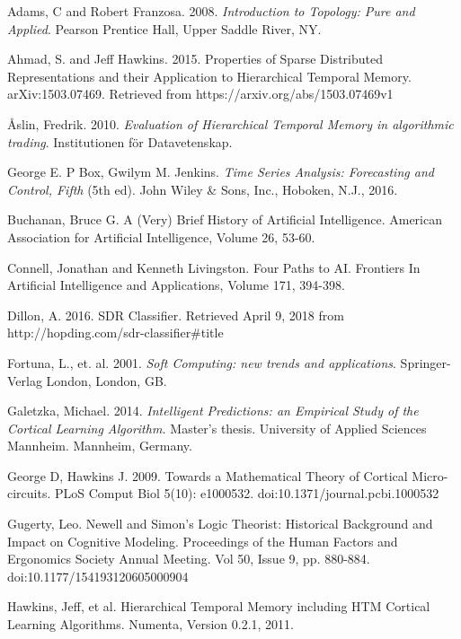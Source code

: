 \documentclass[fleqn,notitlepage,minimal]{article}
\begin{document}
	\newpage
	
	\begin{thebibliography}{99}
				
		 Adams, C and Robert Franzosa. 2008. \textit{Introduction to Topology: Pure and Applied}. Pearson Prentice Hall, Upper Saddle River, NY.
				
		 Ahmad, S. and Jeff Hawkins. 2015. Properties of Sparse Distributed Representations and their Application to Hierarchical Temporal Memory. arXiv:1503.07469. Retrieved from https://arxiv.org/abs/1503.07469v1
		
		 \r{A}slin, Fredrik. 2010. \textit{Evaluation of Hierarchical Temporal Memory in algorithmic trading}. Institutionen f\"{o}r Datavetenskap.
		
		 George E. P Box, Gwilym M. Jenkins. \emph{Time Series Analysis: Forecasting and Control, Fifth} (5th ed). John Wiley \& Sons, Inc., Hoboken, N.J., 2016.
		
		 Buchanan, Bruce G. A (Very) Brief History of Artificial Intelligence. American Association for Artificial Intelligence, Volume 26, 53-60.
		
		 Connell, Jonathan and Kenneth Livingston. Four Paths to AI. Frontiers In Artificial Intelligence and Applications, Volume 171, 394-398.
		
		 Dillon, A. 2016. SDR Classifier. Retrieved April 9, 2018 from http://hopding.com/sdr-classifier\#title
		
		 Fortuna, L., et. al. 2001. \textit{Soft Computing: new trends and applications}. Springer-Verlag London, London, GB.
		
		 Galetzka, Michael. 2014. \emph{Intelligent Predictions: an Empirical Study of the Cortical Learning Algorithm.} Master's thesis. University of Applied Sciences Mannheim. Mannheim, Germany. 
		
		 George D, Hawkins J. 2009. Towards a Mathematical Theory of Cortical Micro-circuits. PLoS Comput Biol 5(10): e1000532. doi:10.1371/journal.pcbi.1000532 
		
		 Gugerty, Leo. Newell and Simon's Logic Theorist: Historical Background and Impact on Cognitive Modeling. Proceedings of the Human Factors and Ergonomics Society Annual Meeting. Vol 50, Issue 9, pp. 880-884.  doi:10.1177/154193120605000904
		
		 Hawkins, Jeff, et al. Hierarchical Temporal Memory including HTM Cortical Learning Algorithms. Numenta, Version 0.2.1, 2011. 
		

\end{thebibliography}
\end{document}
